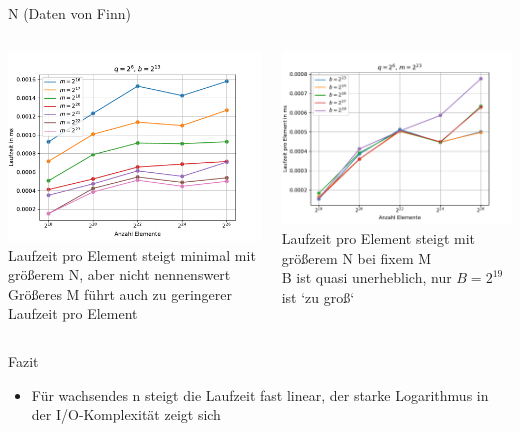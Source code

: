 \documentclass[ngerman,aspectratio=169,10pt]{beamer}
\begin{document}
\begin{frame}{N}
	\centering
	\vspace{-3px}
	(Daten von Finn)
	\vspace{2px}
	\begin{columns}
		\begin{column}{0.5\textwidth}
			\includegraphics[width=\textwidth]{Figure_4_per_element.pdf}
			Laufzeit pro Element steigt minimal mit größerem N, aber nicht nennenswert\\
			Größeres M führt auch zu geringerer Laufzeit pro Element
		\end{column}
		\begin{column}{0.5\textwidth}
			\includegraphics[width=\textwidth]{Figure_5_per_element.pdf}
			Laufzeit pro Element steigt mit größerem N bei fixem M\\
			B ist quasi unerheblich, nur $B=2^{19}$ ist `zu groß`
		\end{column}
	\end{columns}
\end{frame}

\begin{frame}{Fazit}
\begin{itemize}
    \item Für wachsendes n steigt die Laufzeit fast linear, der starke Logarithmus in der I/O-Komplexität zeigt sich
\end{itemize}
\end{frame}
\end{document}
